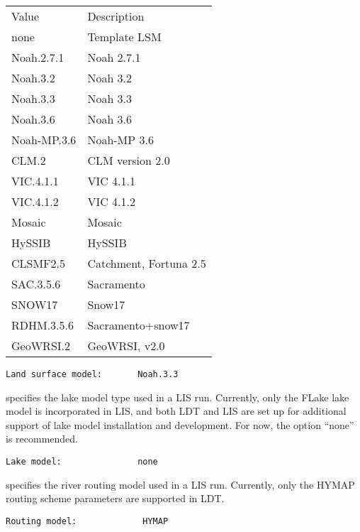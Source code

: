  \begin{tabular}{ll}
 Value       & Description         \\
 none        & Template LSM        \\
 Noah.2.7.1  & Noah 2.7.1          \\
 Noah.3.2    & Noah 3.2            \\
 Noah.3.3    & Noah 3.3            \\
 Noah.3.6    & Noah 3.6            \\
 Noah-MP.3.6 & Noah-MP 3.6         \\
 CLM.2       & CLM version 2.0     \\
 VIC.4.1.1   & VIC 4.1.1           \\
 VIC.4.1.2   & VIC 4.1.2           \\
 Mosaic      & Mosaic              \\
 HySSIB      & HySSIB              \\
 CLSMF2.5    & Catchment, Fortuna 2.5 \\
 SAC.3.5.6   & Sacramento          \\
 SNOW17      & Snow17              \\
 RDHM.3.5.6  & Sacramento+snow17   \\
 GeoWRSI.2   & GeoWRSI, v2.0       \\
 \end{tabular}
 

 \begin{Verbatim}[frame=single]
Land surface model:       Noah.3.3
 \end{Verbatim}

 
  specifies the lake model type used in a LIS run.
 Currently, only the FLake lake model is incorporated in LIS,
 and both LDT and LIS are set up for additional support of lake
 model installation and development.  For now, the option ``none''
 is recommended.
 

 \begin{Verbatim}[frame=single]
Lake model:               none
 \end{Verbatim}

 
  specifies the river routing model used in a LIS run.
 Currently, only the HYMAP routing scheme parameters are supported in LDT.
 

 \begin{Verbatim}[frame=single]
Routing model:             HYMAP
 \end{Verbatim}

